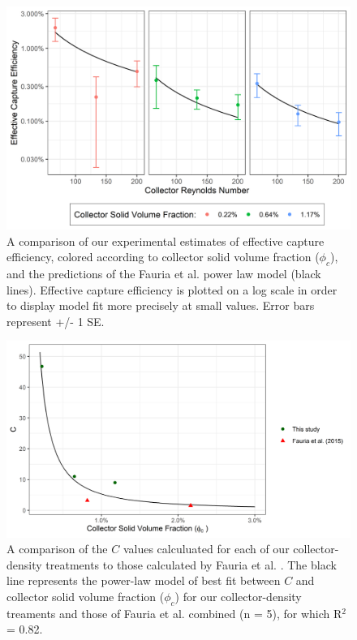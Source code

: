 \documentclass[geosciences,article,submit,moreauthors,pdftex]{Definitions/mdpi}
\begin{document}
\begin{figure}[H]
\centering
\includegraphics[width=5in]{../pics/comparisonplot.png}
\caption{A comparison of our experimental estimates of effective capture efficiency, colored according to collector solid volume fraction ($\phi_c$), and the predictions of the Fauria et al. \cite{Fauria_2015} power law model (black lines). Effective capture efficiency is plotted on a log scale in order to display model fit more precisely at small values. Error bars represent +/- 1 SE.}
\label{fig:compplot}
\end{figure}   

\begin{figure}[H]
\centering
\includegraphics[width=5in]{../pics/cphiplot.png}
\caption{A comparison of the $C$ values calculuated for each of our collector-density treatments to those calculated by Fauria et al. \cite{Fauria_2015}. The black line represents the power-law model of best fit between $C$ and collector solid volume fraction ($\phi_c$) for our collector-density treaments and those of Fauria et al. combined (n = 5), for which R$^2$ = 0.82.}
\label{fig:cphi}
\end{figure}   
\end{document}
